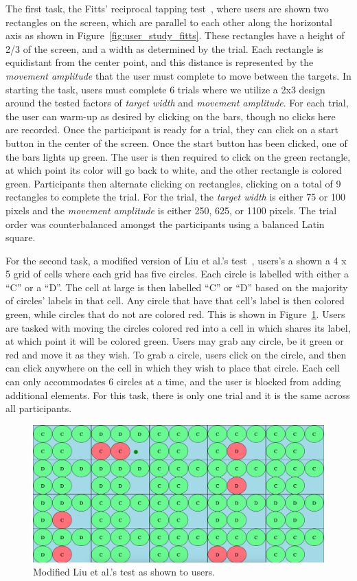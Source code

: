 The first task, the Fitts' reciprocal tapping
test~\cite{fitts_information_1954}, where users are shown two rectangles on the
screen, which are parallel to each other along the horizontal axis as shown
in Figure~\ref{fig:user_study_fitts}. These 
rectangles have a height of 2/3 of the screen, and a width as determined by the 
trial. Each rectangle is equidistant from the center point, and this distance
is represented by the \textit{movement amplitude} that the user must complete
to move between the targets. In starting the task, users must complete 6
trials where we utilize a 2x3 design around the tested factors of
\textit{target width} and \textit{movement amplitude}. For each trial, the user
can warm-up as desired by clicking on the bars, though no clicks here are
recorded. Once the participant is ready for a trial, they can click on a
start button in the center of the screen. Once the start button has been
clicked, one of the bars lights up green. The user is then required to click
on the green rectangle, at which point its color will go back to white, and
the other rectangle is colored green. Participants then alternate clicking on
rectangles, clicking on a total of 9 rectangles to complete the trial. For
the trial, the \textit{target width} is either 75 or 100 pixels and the
\textit{movement amplitude} is either 250, 625, or 1100 pixels. The trial order
was counterbalanced amongst the participants using a balanced Latin square.

For the second task, a modified version of Liu et al.'s 
test~\cite{liu_effects_2014}, users's a shown a 4 x 5 grid of cells where
each grid has five circles. Each circle is labelled with either a ``C'' or
a ``D''. The cell at large is then labelled ``C'' or ``D'' based on the majority
of circles' labels in that cell. Any circle that have that cell's label is
then colored green, while circles that do not are colored red. This is shown
in Figure~\ref{fig:user_study_lius}. Users are tasked with moving the circles
colored red into a cell in which shares its label, at which point it will
be colored green. Users may grab any circle, be it green or red and move it
as they wish. To grab a circle, users click on the circle, and then can click
anywhere on the cell in which they wish to place that circle. Each cell can
only accommodates 6 circles at a time, and the user is blocked from adding
additional elements. For this task, there is only one trial and it is the
same across all participants.

\begin{figure}
\centering
  \includegraphics[width=0.8\columnwidth]{chapters/03_muifold/figures/user_study_lius.png}
  \caption{Modified Liu et al.'s test as shown to users.}
  \label{fig:user_study_lius}
\end{figure}
